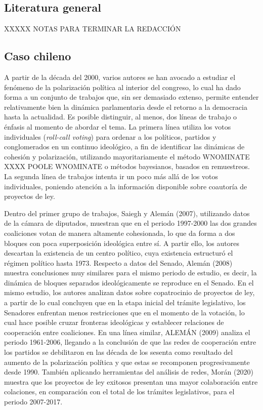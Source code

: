 \documentclass[
  12pt,
]{article}
\begin{document}
\hypertarget{literatura-general}{%
\subsection{Literatura general}\label{literatura-general}}

XXXXX NOTAS PARA TERMINAR LA REDACCIÓN

\hypertarget{caso-chileno}{%
\subsection{Caso chileno}\label{caso-chileno}}

A partir de la década del 2000, varios autores se han avocado a estudiar
el fenómeno de la polarización política al interior del congreso, lo
cual ha dado forma a un conjunto de trabajos que, sin ser demasiado
extenso, permite entender relativamente bien la dinámica parlamentaria
desde el retorno a la democracia hasta la actualidad. Es posible
distinguir, al menos, dos líneas de trabajo o énfasis al momento de
abordar el tema. La primera línea utiliza los votos individuales
(\emph{roll-call voting}) para ordenar a los políticos, partidos y
conglomerados en un continuo ideológico, a fin de identificar las
dinámicas de cohesión y polarización, utilizando mayoritariamente el
método WNOMINATE XXXX POOLE WNOMINATE o métodos bayesianos, basados en
remuestreos. La segunda línea de trabajos intenta ir un poco más allá de
los votos individuales, poniendo atención a la información disponible
sobre coautoría de proyectos de ley.

Dentro del primer grupo de trabajos, Saiegh y Alemán (2007), utilizando
datos de la cámara de diputados, muestran que en el periodo 1997-2000
las dos grandes coaliciones votan de manera altamente cohesionada, lo
que da forma a dos bloques con poca superposición ideológica entre sí. A
partir ello, los autores descartan la existencia de un centro político,
cuya existencia estructuró el régimen político hasta 1973. Respecto a
datos del Senado, Alemán (2008) muestra conclusiones muy similares para
el mismo periodo de estudio, es decir, la dinámica de bloques separados
ideológicamente se reproduce en el Senado. En el mismo estudio, los
autores analizan datos sobre copatrocinio de proyectos de ley, a partir
de lo cual concluyen que en la etapa inicial del trámite legislativo,
los Senadores enfrentan menos restricciones que en el momento de la
votación, lo cual hace posible cruzar fronteras ideológicas y establecer
relaciones de cooperación entre coaliciones. En una línea similar,
ALEMÁN (2009) analiza el periodo 1961-2006, llegando a la conclusión de
que las redes de cooperación entre los partidos se debilitaron en las
década de los sesenta como resultado del aumento de la polarización
política y que estas se recomponen progresivamente desde 1990. También
aplicando herramientas del análisis de redes, Morán (2020) muestra que
los proyectos de ley exitosos presentan una mayor colaboración entre
colaciones, en comparación con el total de los trámites legislativos,
para el periodo 2007-2017.
\end{document}
